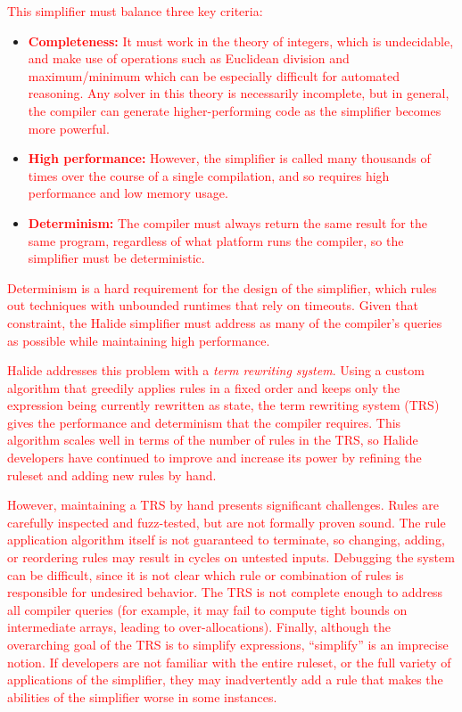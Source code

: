 \documentclass[acmsmall,review]{acmart}\settopmatter{printfolios=true,printccs=false,printacmref=false}
\newcommand{\modified}[1]{\textcolor{red}{{#1}}}
\begin{document}
\modified{This simplifier must balance three key criteria:}

\begin{itemize}
  \item \modified{\textbf{Completeness:}
It must work in 
the theory of integers, which is undecidable, and make use of operations such as 
Euclidean division and maximum/minimum which can be especially difficult for 
automated reasoning. Any solver in this theory is necessarily incomplete, but in general, 
the compiler can generate higher-performing code as the simplifier becomes more powerful.}
  \item \modified{\textbf{High performance:} However, the simplifier is called many thousands of 
times over the course of a single compilation, and so requires high performance and low memory usage. }
  \item \modified{\textbf{Determinism:} The compiler must always return the same 
result for the same program, regardless of what platform runs the compiler, 
so the simplifier must be deterministic.}
\end{itemize}

\modified{Determinism is a hard requirement for the design of the
  simplifier, which rules out techniques with unbounded runtimes that
  rely on timeouts.  Given that constraint, the Halide simplifier must
  address as many of the compiler's queries as possible while
  maintaining high performance.}

\modified{Halide addresses this problem with a \emph{term rewriting system}. Using a custom algorithm 
that greedily applies rules in a fixed order and keeps only the expression being currently 
rewritten as state, the term rewriting system (TRS) gives the performance and determinism 
that the compiler requires. This algorithm scales well in terms of the number of rules
in the TRS, so Halide developers have continued to improve and increase its
power by refining the ruleset and adding new rules by hand.}

\modified{However, maintaining a TRS by hand presents significant challenges. Rules are 
carefully inspected and fuzz-tested, but are not formally proven sound. The 
rule application algorithm itself is not guaranteed to terminate, so changing, adding, or 
reordering rules may result in cycles on untested inputs. Debugging the system can be 
difficult, since it is not clear which rule or combination of rules is responsible for 
undesired behavior. The TRS is not complete enough to address all compiler queries 
(for example, it may fail to compute tight bounds on intermediate arrays, leading to over-allocations).
Finally, although the overarching goal of the TRS is to simplify 
expressions, ``simplify'' is an imprecise notion. If developers are not familiar with 
the entire ruleset, or the full variety of applications of the simplifier, they may inadvertently 
add a rule that makes the abilities of the simplifier worse in some instances. }
\end{document}

